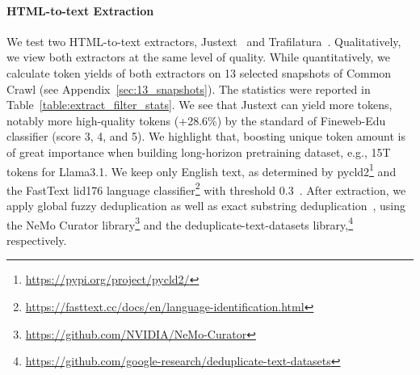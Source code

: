 \documentclass[11pt]{article}
\begin{document}

\paragraph{HTML-to-text Extraction} We test two HTML-to-text extractors, Justext~\citep{pomikalek2011removing} and Trafilatura~\citep{barbaresi-2021-trafilatura}. Qualitatively, we view both extractors at the same level of quality. While quantitatively, we calculate token yields of both extractors on 13 selected snapshots of Common Crawl (see Appendix~\ref{sec:13_snapshots}). The statistics were reported in Table~\ref{table:extract_filter_stats}. We see that Justext can yield more tokens, notably more high-quality tokens (+28.6\%) by the standard of Fineweb-Edu classifier (score 3, 4, and 5). We highlight that, boosting unique token amount is of great importance when building long-horizon pretraining dataset, e.g., 15T tokens for Llama3.1.
We keep only English text, as determined by pycld2\footnote{\url{https://pypi.org/project/pycld2/}} and the FastText lid176 language classifier\footnote{\url{https://fasttext.cc/docs/en/language-identification.html}} with threshold 0.3~\citep{joulin2016fasttext,joulin2016bag}.
After extraction, we apply global fuzzy deduplication as well as exact substring deduplication~\citep{lee2022deduplicating}, using the NeMo Curator library\footnote{\url{https://github.com/NVIDIA/NeMo-Curator}} and the deduplicate-text-datasets library,\footnote{\url{https://github.com/google-research/deduplicate-text-datasets}} respectively.
\end{document}
